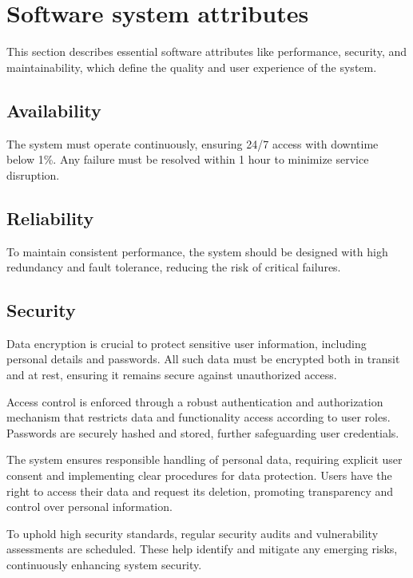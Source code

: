\section{Software system attributes}

This section describes essential software attributes like performance, security, and maintainability, which define the quality and user experience of the system.

\subsection{Availability}

The system must operate continuously, ensuring 24/7 access with downtime below 1\%.
Any failure must be resolved within 1 hour to minimize service disruption.

\subsection{Reliability}

To maintain consistent performance, the system should be designed with high redundancy and fault tolerance, reducing the risk of critical failures.

\subsection{Security}

Data encryption is crucial to protect sensitive user information, including personal details and passwords.
All such data must be encrypted both in transit and at rest, ensuring it remains secure against unauthorized access.

Access control is enforced through a robust authentication and authorization mechanism that restricts data and functionality access according to user roles.
Passwords are securely hashed and stored, further safeguarding user credentials.

The system ensures responsible handling of personal data, requiring explicit user consent and implementing clear procedures for data protection.
Users have the right to access their data and request its deletion, promoting transparency and control over personal information.

To uphold high security standards, regular security audits and vulnerability assessments are scheduled.
These help identify and mitigate any emerging risks, continuously enhancing system security.

